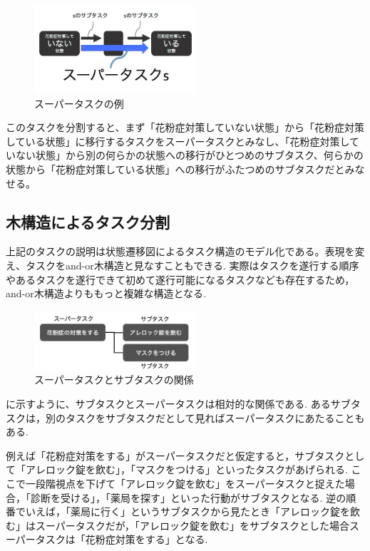 \documentclass[submit,techreq]{ipsj}
\begin{document}
\begin{figure}[tb]
\includegraphics[width=6cm, bb=0 0 400 300]{super_task.jpg}
\caption{スーパータスクの例}
\label{fig:super_task}
\end{figure}

このタスクを分割すると、まず「花粉症対策していない状態」から「花粉症対策している状態」に移行するタスクをスーパータスクとみなし、「花粉症対策していない状態」から別の何らかの状態への移行がひとつめのサブタスク、何らかの状態から「花粉症対策している状態」への移行がふたつめのサブタスクだとみなせる。

\subsection{木構造によるタスク分割}

上記のタスクの説明は状態遷移図によるタスク構造のモデル化である。表現を変え、タスクをand-or木構造と見なすこともできる. 実際はタスクを遂行する順序やあるタスクを遂行できて初めて遂行可能になるタスクなども存在するため，and-or木構造よりももっと複雑な構造となる.


\begin{figure}[tb]
\includegraphics[width=6cm, bb=0 0 400 272]{super_sub.jpg}
\caption{スーパータスクとサブタスクの関係}
\label{fig:super_sub}
\end{figure}

に示すように、サブタスクとスーパータスクは相対的な関係である. あるサブタスクは，別のタスクをサブタスクだとして見ればスーパータスクにあたることもある.

例えば「花粉症対策をする」がスーパータスクだと仮定すると，サブタスクとして「アレロック錠を飲む」，「マスクをつける」といったタスクがあげられる. ここで一段階視点を下げて「アレロック錠を飲む」をスーパータスクと捉えた場合，「診断を受ける」，「薬局を探す」といった行動がサブタスクとなる. 逆の順番でいえば，「薬局に行く」というサブタスクから見たとき「アレロック錠を飲む」はスーパータスクだが，「アレロック錠を飲む」をサブタスクとした場合スーパータスクは「花粉症対策をする」となる.
\end{document}
